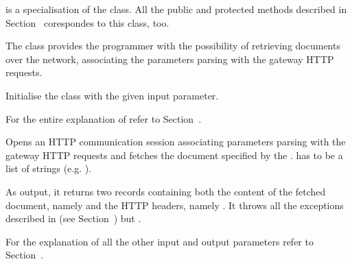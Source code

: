 \documentclass{ozdoc}
\begin{document}
 is a specialisation of the  class. All the public and protected methods described in Section~ corespondes to this class, too.

The  class provides the programmer with the possibility of retrieving documents over the network, associating the parameters parsing with the gateway  HTTP requests. \mozartEMPTY
 \mozartEMPTY
\begin{mozartDESCRIPTION}
\mozartENTRYHASCODE
\begin{mozartSYNOPSIS}
\begin{mozartCODEDISPLAY}\mozartFACETEXT{)}\end{mozartCODEDISPLAY}
\end{mozartSYNOPSIS}
\mozartITEM Initialise the class with the given  input parameter.

  \mozartEMPTY
For the entire explanation of  refer to Section~. \mozartEMPTY
{}\mozartENTRYHASCODE
\begin{mozartSYNOPSIS}
\begin{mozartCODEDISPLAY}\mozartFACETEXT{\mozartSPACE{}}\mozartFACETEXT{\mozartSPACE{}}\mozartFACETEXT{\mozartSPACE{}}\mozartFACETEXT{)}\end{mozartCODEDISPLAY}
\end{mozartSYNOPSIS}
\mozartITEM Opens an HTTP communication session associating  parameters parsing with the gateway  HTTP requests and fetches the document specified by the .  has to be a list of  strings (e.g. \mozartCODEINLINE{\mozartFACETEXT{[}\mozartFACESTRING{"Age=35"}\mozartFACETEXT{\mozartSPACE{}}\mozartFACESTRING{"Occupation=research\mozartSPACE{}assistant"}\mozartFACETEXT{]}}).

As output, it returns two records containing both the content of the fetched document, namely  and the HTTP headers, namely . It throws all the exceptions described in (see Section~) but .

For the explanation of all the other input and output parameters refer to Section~. \mozartEMPTY
\end{mozartDESCRIPTION}
\end{document}
